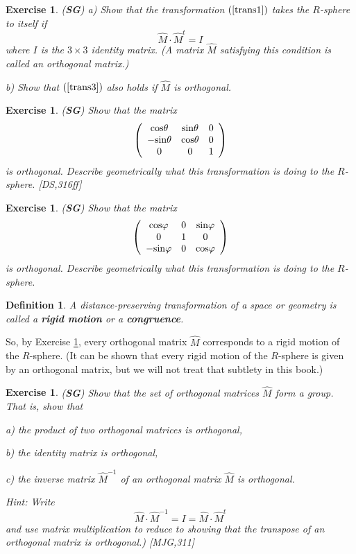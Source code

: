 \documentclass{article}%
\newtheorem{definition}[theorem]{Definition}
\newtheorem{exercise}[theorem]{Exercise}
\begin{document}
\begin{exercise}
\label{trans}(\textbf{SG}) a) Show that the transformation $\left(
\ref{trans1}\right)  $ takes the $R$-sphere to itself if%
\[
\hat{M}\cdot\hat{M}^{t}=I
\]
where $I$ is the $3\times3$ identity matrix. (A matrix $\hat{M}$ satisfying
this condition is called an orthogonal matrix.)

b) Show that $\left(  \ref{trans3}\right)  $ also holds if $\hat{M}$ is orthogonal.
\end{exercise}

\begin{exercise}
(\textbf{SG}) Show that the matrix%
\[
\left(
\begin{array}
[c]{ccc}%
\mathrm{cos}\theta & \mathrm{sin}\theta & 0\\
-\mathrm{sin}\theta & \mathrm{cos}\theta & 0\\
0 & 0 & 1
\end{array}
\right)
\]
is orthogonal. Describe geometrically what this transformation is doing to the
$R$-sphere. [DS,316ff]
\end{exercise}

\begin{exercise}
(\textbf{SG}) Show that the matrix%
\[
\left(
\begin{array}
[c]{ccc}%
\mathrm{cos}\varphi & 0 & \mathrm{sin}\varphi\\
0 & 1 & 0\\
-\mathrm{sin}\varphi & 0 & \mathrm{cos}\varphi
\end{array}
\right)
\]
is orthogonal. Describe geometrically what this transformation is doing to the
$R$-sphere.
\end{exercise}

\begin{definition}
A distance-preserving transformation of a space or geometry is called a
\textbf{rigid motion} or a \textbf{congruence}.
\end{definition}

So, by Exercise \ref{trans}, every orthogonal matrix $\hat{M}$ corresponds to
a rigid motion of the $R$-sphere. (It can be shown that every rigid motion of
the $R$-sphere is given by an orthogonal matrix, but we will not treat that
subtlety in this book.)

\begin{exercise}
(\textbf{SG}) Show that the set of orthogonal matrices $\hat{M}$ form a group.
That is, show that

a) the product of two orthogonal matrices is orthogonal,

b) the identity matrix is orthogonal,

c) the inverse matrix $\hat{M}^{-1}$ of an orthogonal matrix $\hat{M}$ is orthogonal.

Hint: Write%
\[
\hat{M}\cdot\hat{M}^{-1}=I=\hat{M}\cdot\hat{M}^{t}%
\]
and use matrix multiplication to reduce to showing that the transpose of an
orthogonal matrix is orthogonal.) [MJG,311]
\end{exercise}
\end{document}
